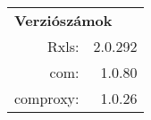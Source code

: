 
  {\ttfamily
    \begin{tabular}{rr@{}}\multicolumn{2}{l}{\textbf{Verziószámok}}\\
      Rxls:&2.0.292\\
com:&1.0.80\\
comproxy:&1.0.26\\
    \end{tabular}
  }%
